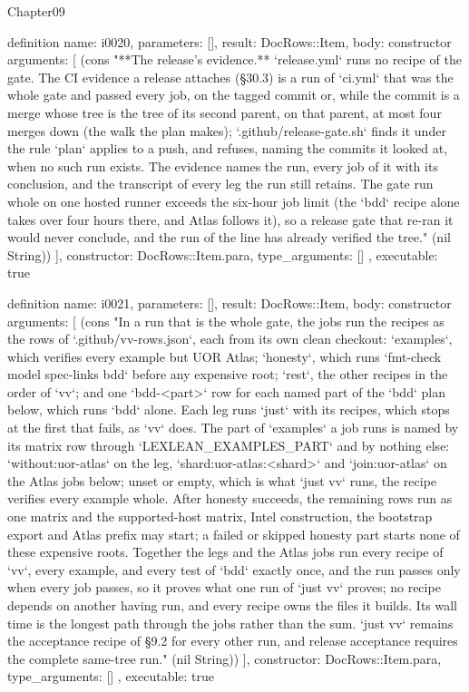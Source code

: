 \begin{lexlean}{Chapter09}
\begin{semanticmodule}
definition{
  name: i0020,
  parameters: [],
  result: DocRows::Item,
  body: constructor{
    arguments: [
      (cons "**The release's evidence.** `release.yml` runs no recipe of the gate. The CI evidence a release attaches (§30.3) is a run of `ci.yml` that was the whole gate and passed every job, on the tagged commit or, while the commit is a merge whose tree is the tree of its second parent, on that parent, at most four merges down (the walk the plan makes); `.github/release-gate.sh` finds it under the rule `plan` applies to a push, and refuses, naming the commits it looked at, when no such run exists. The evidence names the run, every job of it with its conclusion, and the transcript of every leg the run still retains. The gate run whole on one hosted runner exceeds the six-hour job limit (the `bdd` recipe alone takes over four hours there, and Atlas follows it), so a release gate that re-ran it would never conclude, and the run of the line has already verified the tree." (nil String))
    ],
    constructor: DocRows::Item.para,
    type_arguments: []
  },
  executable: true
}

definition{
  name: i0021,
  parameters: [],
  result: DocRows::Item,
  body: constructor{
    arguments: [
      (cons "In a run that is the whole gate, the jobs run the recipes as the rows of `.github/vv-rows.json`, each from its own clean checkout: `examples`, which verifies every example but UOR Atlas; `honesty`, which runs `fmt-check model spec-links bdd` before any expensive root; `rest`, the other recipes in the order of `vv`; and one `bdd-<part>` row for each named part of the `bdd` plan below, which runs `bdd` alone. Each leg runs `just` with its recipes, which stops at the first that fails, as `vv` does. The part of `examples` a job runs is named by its matrix row through `LEXLEAN_EXAMPLES_PART` and by nothing else: `without:uor-atlas` on the leg, `shard:uor-atlas:<shard>` and `join:uor-atlas` on the Atlas jobs below; unset or empty, which is what `just vv` runs, the recipe verifies every example whole. After honesty succeeds, the remaining rows run as one matrix and the supported-host matrix, Intel construction, the bootstrap export and Atlas prefix may start; a failed or skipped honesty part starts none of these expensive roots. Together the legs and the Atlas jobs run every recipe of `vv`, every example, and every test of `bdd` exactly once, and the run passes only when every job passes, so it proves what one run of `just vv` proves; no recipe depends on another having run, and every recipe owns the files it builds. Its wall time is the longest path through the jobs rather than the sum. `just vv` remains the acceptance recipe of §9.2 for every other run, and release acceptance requires the complete same-tree run." (nil String))
    ],
    constructor: DocRows::Item.para,
    type_arguments: []
  },
  executable: true
}


\end{semanticmodule}
\end{lexlean}
